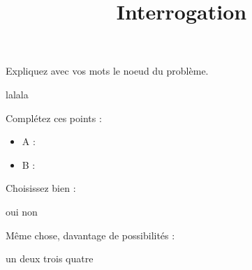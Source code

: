 \usepackage{amsmath}
\usepackage{graphicx}
\usepackage{url}
\usepackage{duration}
\usepackage{marginnote}
\title{Interrogation}

\maketitle

\begin{questions}
\question[1]
Expliquez avec vos mots le noeud du problème.
\begin{solutionordottedlines}[2cm]
lalala
\end{solutionordottedlines}

\question[2]
Complétez ces points :
\begin{itemize}
\item A : 
\item B : 
\end{itemize}

\question[1]
Choisissez bien :
\begin{oneparcheckboxes}
\choice oui
\correctchoice non
\end{oneparcheckboxes}

\question[1]
Même chose, davantage de possibilités :
\begin{checkboxes}
\choice un
\correctchoice deux
\choice trois
\choice quatre
\end{checkboxes}


\end{questions}

